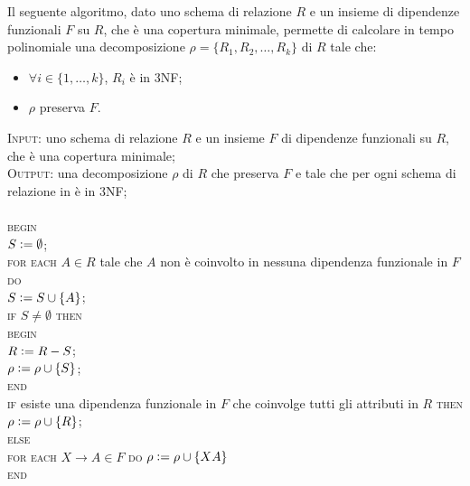 Il seguente algoritmo, dato uno schema di relazione $R$ e un insieme di dipendenze funzionali $F$ su $R$, che è una 
copertura minimale, permette di calcolare in tempo polinomiale una decomposizione $\rho = \{R_1, R_2, \ldots, R_k\}$ 
di $R$ tale che:
\begin{itemize}
 \item $\forall i \in \{1, \ldots, k\}$, $R_i$ è in 3NF;
 \item $\rho$ preserva $F$.
\end{itemize}

\begin{alg}
 \textsc{Input}: uno schema di relazione $R$ e un insieme $F$ di dipendenze funzionali su $R$, che è una copertura
 minimale;\\
 \textsc{Output}: una decomposizione $\rho$ di $R$ che preserva $F$ e tale che per ogni schema di relazione in è 
 in 3NF;\\\\
 \textsc{begin}\\
 $S\vcentcolon= \emptyset$;\\
 \textsc{for each} $A \in R$ tale che $A$ non è coinvolto in nessuna dipendenza funzionale in $F$ \textsc{do}\\
 \indent $S\vcentcolon= S \cup \{A\}$;\\
 \textsc{if} $S \not= \emptyset$ \textsc{then}\\
\indent \textsc{begin}\\
\indent $R\vcentcolon= R-S$;\\
\indent $\rho\vcentcolon=\rho \cup \{S\}$;\\
\indent \textsc{end}\\
\textsc{if} esiste una dipendenza funzionale in $F$ che coinvolge tutti gli attributi in $R$ \textsc{then}\\
\indent $\rho\vcentcolon= \rho \cup \{R\}$;\\
\textsc{else}\\
\indent \textsc{for each} $X \rightarrow A \in F$ \textsc{do} $\rho\vcentcolon= \rho \cup \{XA\}$\\
\textsc{end}\\
\end{alg}

